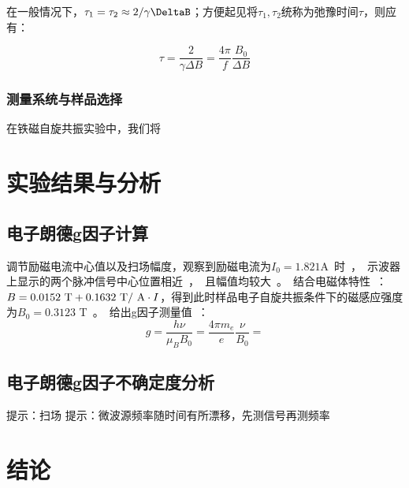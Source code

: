 \documentclass{thuemp}
\begin{document}
在一般情况下，$\tau_1 = \tau_2 \approx 2/\gamma \DeltaB$；方便起见将$\tau_1, \tau_2$统称为弛豫时间$\tau$，则应有：

\begin{equation}
    \tau = \frac{2}{\gamma\Delta B} = \frac{4\pi}{f}\frac{B_0}{\Delta B}
\end{equation}

\subsubsection{测量系统与样品选择}

在铁磁自旋共振实验中，我们将

\section{实验结果与分析}

\subsection{电子朗德g因子计算}

调节励磁电流中心值以及扫场幅度，观察到励磁电流为$I_0 = 1.821$\si\ampere 时，示波器上显示的两个脉冲信号中心位置相近，且幅值均较大。结合电磁体特性：$B = 0.0152 ~\text{\si\tesla} + 0.1632 ~\text{\si\tesla / \si\ampere} \cdot I$，得到此时样品电子自旋共振条件下的磁感应强度为$B_0 = 0.3123$ \si\tesla。给出g因子测量值：

\begin{equation}
g = \frac{h \nu}{\mu_B B_0} = \frac{4\pi m_e}{e} \frac{\nu}{B_0}= 
\end{equation}

\subsection{电子朗德g因子不确定度分析}




提示：扫场
提示：微波源频率随时间有所漂移，先测信号再测频率

\section{结论}



\renewcommand\refname{\heiti\wuhao\centerline{参考文献}\global\def\refname{参考文献}}
\vskip 12pt
\end{document}
